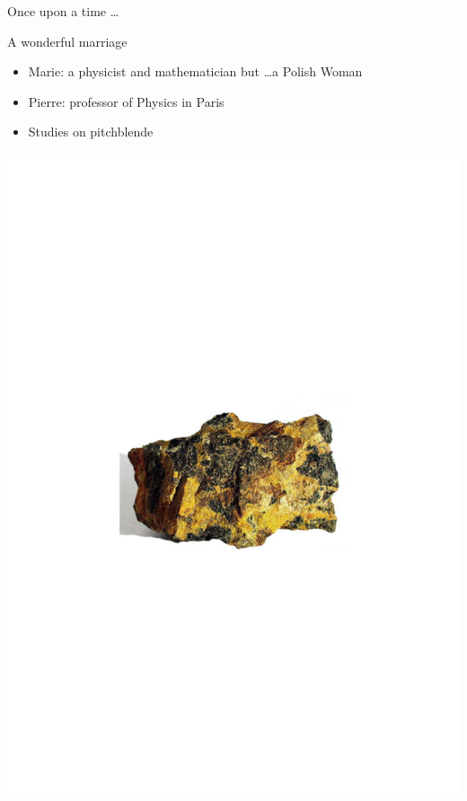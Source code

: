 \begin{frame}{Once upon a time \ldots}

  \begin{exampleblock}{A wonderful marriage}
   \begin{itemize}
   \item Marie: a physicist and mathematician but \ldots a Polish Woman
   \item Pierre: professor of Physics in Paris
   \item Studies on pitchblende 
   \end{itemize}
  \end{exampleblock}

\vskip-4cm
\centering \includegraphics[scale=0.4]{figures/20160216_rsw_pechblenda.pdf}

\end{frame}

